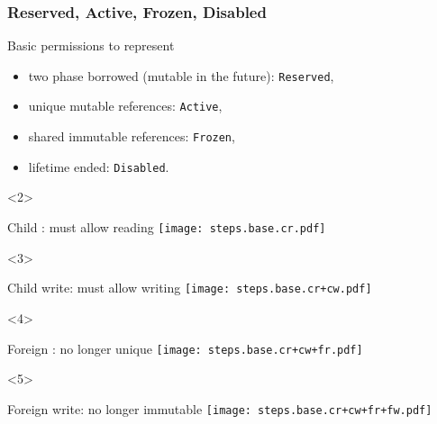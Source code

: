 \begin{frame}[t]
    \frametitle{Reserved, Active, Frozen, Disabled}
    Basic permissions to represent
    \begin{itemize}
        \item two phase borrowed (mutable in the future): \texttt{Reserved},
        \item unique mutable references: \texttt{Active},
        \item shared immutable references: \texttt{Frozen},
        \item lifetime ended: \texttt{Disabled}.
    \end{itemize}

    \begin{onlyenv}<2>
        \begin{block}{Child : must allow reading}
        \texttt{[image: steps.base.cr.pdf]}
        \end{block}
    \end{onlyenv}

    \begin{onlyenv}<3>
        \begin{block}{Child write: must allow writing}
        \texttt{[image: steps.base.cr+cw.pdf]}
        \end{block}
    \end{onlyenv}

    \begin{onlyenv}<4>
        \begin{block}{Foreign : no longer unique}
        \texttt{[image: steps.base.cr+cw+fr.pdf]}
        \end{block}
    \end{onlyenv}

    \begin{onlyenv}<5>
        \begin{block}{Foreign write: no longer immutable}
        \texttt{[image: steps.base.cr+cw+fr+fw.pdf]}
        \end{block}
    \end{onlyenv}
\end{frame}

